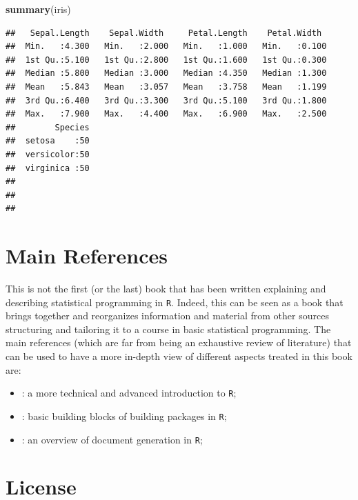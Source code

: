 \documentclass[]{book}
\newenvironment{Shaded}{\begin{snugshade}}{\end{snugshade}}
\newcommand{\KeywordTok}[1]{\textcolor[rgb]{0.13,0.29,0.53}{\textbf{{#1}}}}
\newcommand{\NormalTok}[1]{{#1}}
\providecommand{\tightlist}{%
  \setlength{\itemsep}{0pt}\setlength{\parskip}{0pt}}
\theoremstyle{definition}
\theoremstyle{definition}
\theoremstyle{remark}
\begin{document}
\begin{Shaded}
\begin{Highlighting}[]
\KeywordTok{summary}\NormalTok{(iris)}
\end{Highlighting}
\end{Shaded}

\begin{verbatim}
##   Sepal.Length    Sepal.Width     Petal.Length    Petal.Width   
##  Min.   :4.300   Min.   :2.000   Min.   :1.000   Min.   :0.100  
##  1st Qu.:5.100   1st Qu.:2.800   1st Qu.:1.600   1st Qu.:0.300  
##  Median :5.800   Median :3.000   Median :4.350   Median :1.300  
##  Mean   :5.843   Mean   :3.057   Mean   :3.758   Mean   :1.199  
##  3rd Qu.:6.400   3rd Qu.:3.300   3rd Qu.:5.100   3rd Qu.:1.800  
##  Max.   :7.900   Max.   :4.400   Max.   :6.900   Max.   :2.500  
##        Species  
##  setosa    :50  
##  versicolor:50  
##  virginica :50  
##                 
##                 
## 
\end{verbatim}

\section{Main References}\label{main-references}

This is not the first (or the last) book that has been written
explaining and describing statistical programming in \texttt{R}. Indeed,
this can be seen as a book that brings together and reorganizes
information and material from other sources structuring and tailoring it
to a course in basic statistical programming. The main references (which
are far from being an exhaustive review of literature) that can be used
to have a more in-depth view of different aspects treated in this book
are:

\begin{itemize}
\tightlist
\item
  \citet{wickham2014advanced} : a more technical and advanced
  introduction to \texttt{R};
\item
  \citet{wickham2015packages} : basic building blocks of building
  packages in \texttt{R};
\item
  \citet{xie2015} : an overview of document generation in \texttt{R};
\end{itemize}

\section{License}\label{license}
\end{document}
